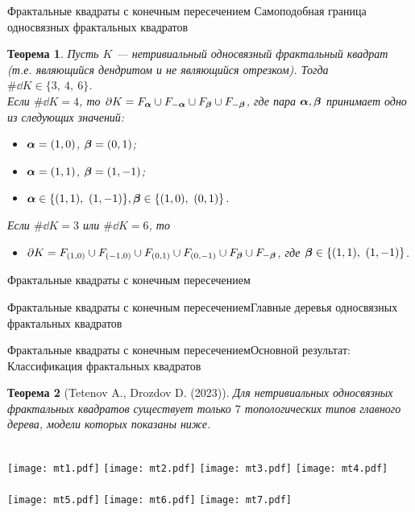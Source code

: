 \documentclass[aspectratio=1610, 10pt, notheorems]{beamer}
\newtheorem{theorem}     {Теорема}
\begin{document}
\begin{frame}{Фрактальные квадраты с конечным пересечением} {Самоподобная граница односвязных фрактальных квадратов}
\begin{theorem}\label{ssboundary}
Пусть $K$ --- нетривиальный односвязный фрактальный квадрат (т.е. являющийся дендритом и не являющийся отрезком).
Тогда $\#\dd K\in\{3,\ 4,\ 6\}$. \\
Если $\#\dd K=4$, то  $\partial K=F_{\bm{\alpha}}\cup F_{-{\bm{\alpha}}}\cup F_{\bm{\beta}}\cup F_{-{\bm{\beta}}}$, где   пара  ${\bm{\alpha}},{\bm{\beta}}$ принимает одно из следующих значений:
	\begin{itemize}%
	\item[{\bf A.}] ${\bm{\alpha}}=(1,0)$, $ {\bm{\beta}}=(0,1)$;
	\item[{\bf B.}] ${\bm{\alpha}}=(1,1)$, $ {\bm{\beta}}=(1,-1)$;
	\item[{\bf C.}] $\bma\in\{(1,1),\ (1,-1)\},\bmb\in\{(1,0),\ (0,1)\}$.
	\end{itemize}
 Если $\#\dd K=3$ или $\#\dd K=6$, то
\begin{itemize}%
	\item[{\bf D.}] $\partial K=F_{(1,0)}\cup F_{(-1,0)}\cup F_{(0,1)}\cup F_{(0,-1)}\cup F_{\bm{\beta}}\cup F_{-{\bm{\beta}}}$, где ${\bm{\beta}}\in\{(1,1),\ (1,-1)\}$.
	\end{itemize}
\end{theorem}
\end{frame}


\begin{frame}{Фрактальные квадраты с конечным пересечением}{
}
\begin{center}
\end{center}
\end{frame}


\begin{frame}{Фрактальные квадраты с конечным пересечением}{Главные деревья односвязных фрактальных квадратов}
\end{frame}


\begin{frame}{Фрактальные квадраты с конечным пересечением}{Основной результат: Классификация фрактальных квадратов}

\begin{theorem}[Tetenov A., Drozdov D.  (2023)]
Для нетривиальных односвязных фрактальных квадратов существует только $7$ топологических типов главного дерева, модели которых показаны ниже.
\end{theorem}
\;\\
\texttt{[image: mt1.pdf]}
\hfill
\texttt{[image: mt2.pdf]}
\hfill
\texttt{[image: mt3.pdf]}
\hfill
\texttt{[image: mt4.pdf]}\\ \;\\
\texttt{[image: mt5.pdf]}
\hfill
\texttt{[image: mt6.pdf]}
\hfill
\texttt{[image: mt7.pdf]}
\end{frame}
\end{document}
